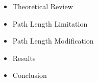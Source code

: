 \documentclass[preview]{standalone}
\begin{document}
\begin{center}
\begin{itemize}
            \item Theoretical Review
            \item Path Length Limitation
            \item Path Length Modification
            \item Results
            \item Conclusion
        \end{itemize}
\end{center}
\end{document}
